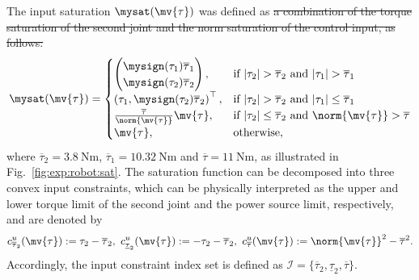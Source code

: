 \documentclass[letterpaper, journal]{IEEEtran}
\providecommand{\DIFadd}[1]{{\protect\color{blue}\uwave{#1}}} %
\providecommand{\DIFdel}[1]{{\protect\color{red}\sout{#1}}} %
\providecommand{\DIFaddbegin}{} %
\providecommand{\DIFaddend}{} %
\providecommand{\DIFdelbegin}{} %
\providecommand{\DIFdelend}{} %
\begin{document}
The input saturation $\mysat(\mv{\tau})$ was defined as \DIFdelbegin \DIFdel{a combination of the torque saturation of the second joint and the norm saturation of the control input, as follows:
}\DIFdelend \DIFaddbegin \DIFadd{follows:
}\DIFaddend \begin{equation} \label{eq:exp:sat}
  \mysat(\mv{\tau})
  =
  \begin{cases}
    \begin{pmatrix}
      \mysign(\tau_1)\overline{\tau}_1
      \\
      \mysign(\tau_2)\overline{\tau}_2
    \end{pmatrix}
    , &
    \text{if }
    \vert\tau_2\vert > \overline{\tau}_2
    \text{ and }
    \vert\tau_1\vert > \overline{\tau}_1
    \\
    \left(
      \tau_1
      , 
      \mysign(\tau_2)\overline{\tau}_2
    \right)^\top
    , &
    \text{if }
    \vert\tau_2\vert > \overline{\tau}_2
    \text{ and }
    \vert\tau_1\vert \le \overline{\tau}_1
    \\
    \tfrac{\overline{\tau}}{\norm{\mv{\tau}}}\mv{\tau}
    , &
    \text{if }
    |\tau_2| \le \overline{\tau}_2
    \text{ and }
    \norm{\mv{\tau}} > \overline{\tau}
    \\
    \mv{\tau}
    , &
    \text{otherwise}
    ,
  \end{cases}
\end{equation}
where $\overline{\tau}_2=\qty{3.8}{\newton\meter}$, $\overline{\tau}_1=\qty{10.32}{\newton\meter}$ and $\overline{\tau}=\qty{11}{\newton\meter}$, as illustrated in Fig.~\ref{fig:exp:robot:sat}.
The saturation function can be decomposed into three convex input constraints, which can be physically interpreted as the upper and lower torque limit of the second joint and the power source limit, respectively, and are denoted by
\begin{equation} \label{eq:val:cstr:input}
  c^u_{\overline{\tau}_2}(\mv{\tau}) 
  := 
  \tau_2 - \overline{\tau}_2
  ,
  \ 
  c^u_{\underline{\tau}_2}(\mv{\tau}) 
  := 
  -\tau_2 - \overline{\tau}_2
  ,
  \ 
  c^u_{\overline{\tau}}(\mv{\tau})
  := 
  \norm{\mv{\tau}}^2 - \overline{\tau}^2
  .
\end{equation}
Accordingly, the input constraint index set is defined as $\mathcal{I} = \{\overline{\tau}_2, \underline{\tau}_2, \overline{\tau}\}$.
\end{document}
